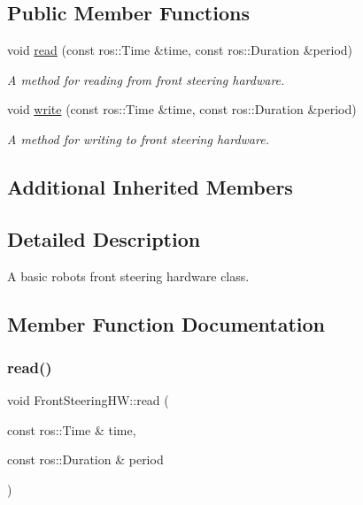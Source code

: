 \subsection*{Public Member Functions}
\begin{DoxyCompactItemize}
\item 
void \hyperlink{classFrontSteeringHW_aa037e3ea1fbc4e58b40e236810bed3ca}{read} (const ros\+::\+Time \&time, const ros\+::\+Duration \&period)
\begin{DoxyCompactList}\small\item\em A method for reading from front steering hardware. \end{DoxyCompactList}\item 
void \hyperlink{classFrontSteeringHW_aa0e57cc4919044aecb7d1c76c8d4ac21}{write} (const ros\+::\+Time \&time, const ros\+::\+Duration \&period)
\begin{DoxyCompactList}\small\item\em A method for writing to front steering hardware. \end{DoxyCompactList}\end{DoxyCompactItemize}
\subsection*{Additional Inherited Members}


\subsection{Detailed Description}
A basic robot\textquotesingle{}s front steering hardware class. 

\subsection{Member Function Documentation}
\mbox{\label{classFrontSteeringHW_aa037e3ea1fbc4e58b40e236810bed3ca}} 
\subsubsection{\texorpdfstring{read()}{read()}}
{\footnotesize\ttfamily void Front\+Steering\+H\+W\+::read (\begin{DoxyParamCaption}\item[{const ros\+::\+Time \&}]{time,  }\item[{const ros\+::\+Duration \&}]{period }\end{DoxyParamCaption})\hspace{0.3cm}{\ttfamily [virtual]}}



